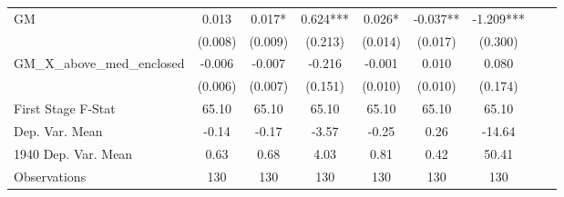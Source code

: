 \begin{tabular}{l*{8}{c}}
\cmidrule(lr){1-7}
GM              &    0.013   &    0.017*  &    0.624***&    0.026*  &   -0.037** &   -1.209***\\
                &  (0.008)   &  (0.009)   &  (0.213)   &  (0.014)   &  (0.017)   &  (0.300)   \\
\addlinespace
GM\_X\_above\_med\_enclosed&   -0.006   &   -0.007   &   -0.216   &   -0.001   &    0.010   &    0.080   \\
                &  (0.006)   &  (0.007)   &  (0.151)   &  (0.010)   &  (0.010)   &  (0.174)   \\
\midrule
First Stage F-Stat&    65.10   &    65.10   &    65.10   &    65.10   &    65.10   &    65.10   \\
Dep. Var. Mean  &    -0.14   &    -0.17   &    -3.57   &    -0.25   &     0.26   &   -14.64   \\
1940 Dep. Var. Mean&     0.63   &     0.68   &     4.03   &     0.81   &     0.42   &    50.41   \\
Observations    &      130   &      130   &      130   &      130   &      130   &      130   \\
       \bottomrule \end{tabular}
